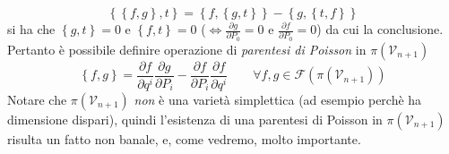 \begin{equation}
\left\lbrace \left\lbrace f,g \right\rbrace ,t \right\rbrace = \left\lbrace f, \left\lbrace g,t \right\rbrace \right\rbrace - \left\lbrace g,\left\lbrace t,f \right\rbrace \right\rbrace 
\end{equation}
si ha che $ \left\lbrace g,t \right\rbrace=0$ e $\left\lbrace f,t \right\rbrace=0$ ($\Leftrightarrow \frac{\partial g}{\partial P_{0}} = 0 \text{ e } \frac{\partial f}{\partial P_{0}} = 0$) da cui la conclusione.\\
Pertanto è possibile definire operazione di \textit{parentesi di Poisson} in \textit{$\pi(\mathcal{V}_{n+1})$}
\begin{equation}
\left\lbrace f, g \right\rbrace = \frac{\partial f}{\partial q^i}\frac{\partial g}{\partial P_i}- \frac{\partial f}{\partial P_i}\frac{\partial f}{\partial q^i} \qquad \forall f, g \in \mathcal{F}(\pi (\mathcal{V}_{n+1}))
\end{equation}
Notare che $\pi (\mathcal{V}_{n+1})$ \textit{non} è una varietà simplettica (ad esempio perchè ha dimensione dispari), quindi l'esistenza di una parentesi di Poisson in $\pi (\mathcal{V}_{n+1})$ risulta un fatto non banale, e, come vedremo, molto importante.

